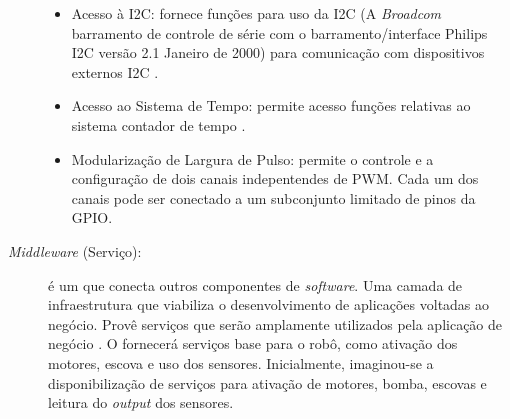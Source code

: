 \begin{description}
\begin{itemize}
  \item Acesso à I2C: fornece funções para uso da I2C (A \textit{Broadcom}
  barramento de controle de série com o barramento/interface Philips I2C
  versão 2.1 Janeiro de 2000) para comunicação com dispositivos externos
  I2C \cite{mccauley2015}.
  
  \item Acesso ao Sistema de Tempo: permite acesso funções relativas ao
  sistema contador de tempo \cite{mccauley2015}.
  
  \item Modularização de Largura de Pulso: permite o controle e a configuração
  de dois canais indepentendes de PWM. Cada um dos canais pode ser conectado a
  um subconjunto limitado de pinos da GPIO.
\end{itemize}

\item[\textit{Middleware} (Serviço):] é um \software que conecta outros componentes
de \textit{software}. Uma camada de infraestrutura que viabiliza o desenvolvimento de
aplicações voltadas ao negócio. Provê serviços que serão amplamente utilizados
pela aplicação de negócio \cite{oracle2016}. O \middleware fornecerá serviços base para
o robô, como ativação dos motores, escova e uso dos sensores. Inicialmente, imaginou-se
a disponibilização de serviços para ativação de motores, bomba, escovas e leitura do
\textit{output} dos sensores.
\end{description}

